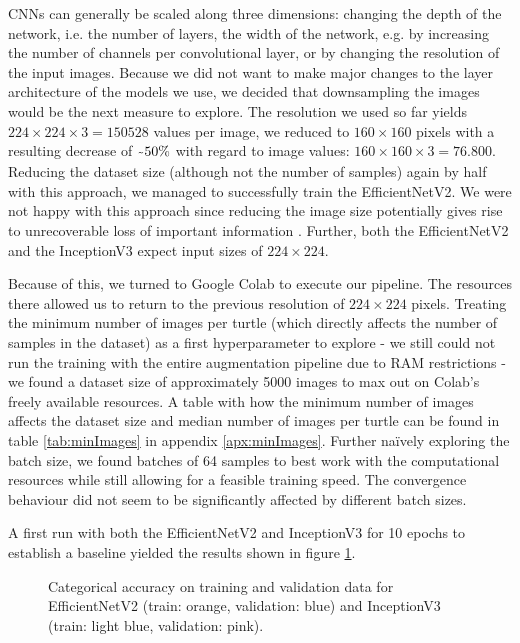 CNNs can generally be scaled along three dimensions: changing the depth of the network, i.e. the number of layers, the width of the network, e.g. by increasing the number of channels per convolutional layer, or by changing the resolution of the input images. Because we did not want to make major changes to the layer architecture of the models we use, we decided that downsampling the images would be the next measure to explore. The resolution we used so far yields $224\times224\times3=150528$ values per image, we reduced to $160\times160$ pixels with a resulting decrease of $\raisebox{-0.9ex}{\~{}} 50\%$ with regard to image values: $160\times160\times3=76.800$. Reducing the dataset size (although not the number of samples) again by half with this approach, we managed to successfully train the EfficientNetV2. We were not happy with this approach since reducing the image size potentially gives rise to unrecoverable loss of important information \citep{Zhang2011}. Further, both the EfficientNetV2 and the InceptionV3 expect input sizes of $224\times224$.

Because of this, we turned to Google Colab to execute our pipeline. The resources there allowed us to return to the previous resolution of $224\times224$ pixels. Treating the minimum number of images per turtle (which directly affects the number of samples in the dataset) as a first hyperparameter to explore - we still could not run the training with the entire augmentation pipeline due to RAM restrictions - we found a dataset size of approximately 5000 images to max out on Colab's freely available resources. A table with how the minimum number of images affects the dataset size and median number of images per turtle can be found in table \ref{tab:minImages} in appendix \ref{apx:minImages}. Further naïvely exploring the batch size, we found batches of 64 samples to best work with the computational resources while still allowing for a feasible training speed. The convergence behaviour did not seem to be significantly affected by different batch sizes.

A first run with both the EfficientNetV2 and InceptionV3 for 10 epochs to establish a baseline yielded the results shown in figure \ref{fig:efficientInceptionComparison}.

\begin{figure}[h!]
    \centering
    
    \caption{Categorical accuracy on training and validation data for EfficientNetV2 (train: orange, validation: blue) and InceptionV3 (train: light blue, validation: pink).}
    \label{fig:efficientInceptionComparison}
\end{figure}


